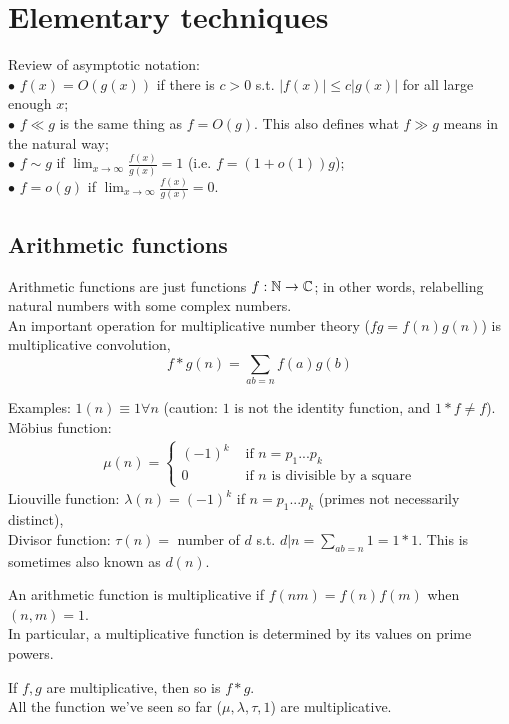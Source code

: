 \documentclass[a4paper]{article}
\begin{document}
\newpage

\section{Elementary techniques}
Review of asymptotic notation:\\
$\bullet$ $f(x) = O(g(x))$ if there is $c>0$ s.t. $|f(x)| \leq c|g(x)|$ for all large enough $x$;\\
$\bullet$ $f \ll g$ is the same thing as $f=O(g)$. This also defines what $f \gg g$ means in the natural way;\\
$\bullet$ $f \sim g$ if $\lim_{x \to \infty} \frac{f(x)}{g(x)} = 1$ (i.e. $f=(1+o(1))g$);\\
$\bullet$ $f=o(g)$ if $\lim_{x \to \infty} \frac{f(x)}{g(x)} = 0$.

\subsection{Arithmetic functions}
Arithmetic functions are just functions $f:\mathbb{N} \to \mathbb{C}$; in other words, relabelling natural numbers with some complex numbers.\\
An important operation for multiplicative number theory ($fg = f(n)g(n)$) is multiplicative convolution,
$$f*g(n) = \sum_{ab=n}f(a)g(b)$$

Examples: $1(n) \equiv 1 \forall n$ (caution: $1$ is not the identity function, and $1*f \neq f$).\\
M\"{o}bius function:
\begin{equation*}
\begin{aligned}
\mu(n) = \left\{\begin{array}{ll}
(-1)^k & \text{ if } n=p_1...p_k\\
0 & \text{ if } n \text{ is divisible by a square} 
\end{array}
\right.
\end{aligned}
\end{equation*}
Liouville function: $\lambda(n) = (-1)^k$ if $n=p_1...p_k$ (primes not necessarily distinct),\\
Divisor function: $\tau(n) = $ number of $d$ s.t. $d|n = \sum_{ab = n} 1 = 1*1$. This is sometimes also known as $d(n)$.

An arithmetic function is multiplicative if $f(nm) = f(n)f(m)$ when $(n,m)=1$.\\
In particular, a multiplicative function is determined by its values on prime powers.

\begin{fact}
If $f,g$ are multiplicative, then so is $f*g$.\\
All the function we've seen so far ($\mu,\lambda,\tau,1$) are multiplicative.
\end{fact}
\end{document}
